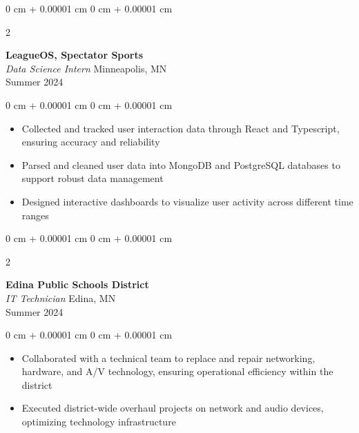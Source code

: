 \documentclass[10pt, letterpaper]{article}
\newenvironment{highlights}{
    \begin{itemize}[
        topsep=0.10 cm,
        parsep=0.10 cm,
        partopsep=0pt,
        itemsep=0pt,
        leftmargin=0 cm + 10pt
    ]
}{
    \end{itemize}
} %
\newenvironment{onecolentry}{
    \begin{adjustwidth}{
        0 cm + 0.00001 cm
    }{
        0 cm + 0.00001 cm
    }
}{
    \end{adjustwidth}
} %
\newenvironment{twocolentry}[2][]{
    \onecolentry
    \def\secondColumn{#2}
    \setcolumnwidth{\fill, 4.5 cm}
    \begin{paracol}{2}
}{
    \switchcolumn \raggedleft \secondColumn
    \end{paracol}
    \endonecolentry
} %
\begin{document}
        \vspace{0.2 cm}

        
        \begin{twocolentry}{
            Minneapolis, MN
            \\Summer 2024
        }
            \textbf{LeagueOS, Spectator Sports}
            \\\textit{Data Science Intern}\end{twocolentry}

        \vspace{0.10 cm}
        \begin{onecolentry}
            \begin{highlights}
                \item Collected and tracked user interaction data through React and Typescript, ensuring accuracy and reliability
                \item Parsed and cleaned user data into MongoDB and PostgreSQL databases to support robust data management
                \item Designed interactive dashboards to visualize user activity across different time ranges
            \end{highlights}
        \end{onecolentry}


        \vspace{0.2 cm}

        \begin{twocolentry}{
            Edina, MN
            \\Summer 2024
        }
            \textbf{Edina Public Schools District}
            \\\textit{IT Technician}\end{twocolentry}

        \vspace{0.10 cm}
        \begin{onecolentry}
            \begin{highlights}
                \item Collaborated with a technical team to replace and repair networking, hardware, and A/V technology, ensuring operational efficiency within the district
                \item Executed district-wide overhaul projects on network and audio devices, optimizing technology infrastructure
            \end{highlights}
        \end{onecolentry}
\end{document}
